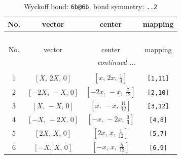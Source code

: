 \documentclass[fleqn,8pt]{jsarticle}
\begin{document}
\begin{longtable}{cccc}
\caption{Wyckoff bond: {\tt 6b@6b}, bond symmetry: {\tt ..2}}
 \\
 \hline \hline
No. & vector & center & mapping \\ \hline \endfirsthead

\multicolumn{3}{l}{\tablename\ \thetable{}} \\
 \hline \hline
No. & vector & center & mapping \\ \hline \endhead

 \hline \hline
\multicolumn{3}{r}{\footnotesize\it continued ...} \\ \endfoot

 \hline \hline
\multicolumn{3}{r}{} \\ \endlastfoot

1 & $\left[ X,\, 2 X,\, 0 \right]$ & $\left[ x,\, 2 x,\, \frac{1}{4} \right]$ & {\tt [1,11]} \\ \hline
2 & $\left[ - 2 X,\, - X,\, 0 \right]$ & $\left[ - 2 x,\, - x,\, \frac{7}{12} \right]$ & {\tt [2,10]} \\ \hline
3 & $\left[ X,\, - X,\, 0 \right]$ & $\left[ x,\, - x,\, \frac{11}{12} \right]$ & {\tt [3,12]} \\ \hline
4 & $\left[ - X,\, - 2 X,\, 0 \right]$ & $\left[ - x,\, - 2 x,\, \frac{3}{4} \right]$ & {\tt [4,8]} \\ \hline
5 & $\left[ 2 X,\, X,\, 0 \right]$ & $\left[ 2 x,\, x,\, \frac{1}{12} \right]$ & {\tt [5,7]} \\ \hline
6 & $\left[ - X,\, X,\, 0 \right]$ & $\left[ - x,\, x,\, \frac{5}{12} \right]$ & {\tt [6,9]} \\
\end{longtable}
\renewcommand{\arraystretch}{1.2}
\end{document}

